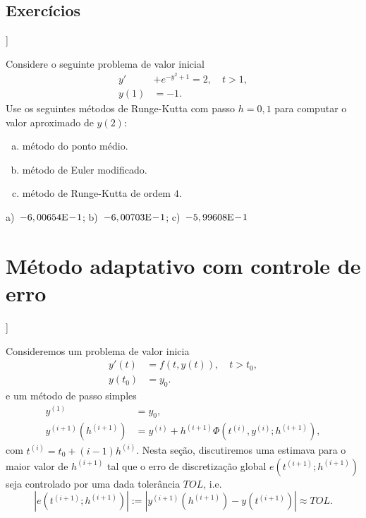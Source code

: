 \subsection{Exercícios}

\begin{flushleft}
  [[tag:revisar]]
\end{flushleft}

\begin{exer}
  Considere o seguinte problema de valor inicial
  \begin{align}
    y' &+ e^{-y^2+1} = 2,\quad t>1,\\
    y(1) &= -1.
  \end{align}
Use os seguintes métodos de Runge-Kutta com passo $h=0,1$ para computar o valor aproximado de $y(2)$:
\begin{enumerate}[a)]
\item método do ponto médio.
\item método de Euler modificado.
\item método de Runge-Kutta de ordem $4$.
\end{enumerate}
\end{exer}
\begin{resp}
  a)~$-6,00654\mathrm{E}\!-\!1$; b)~$-6,00703\mathrm{E}\!-\!1$; c)~$-5,99608\mathrm{E}\!-\!1$
\end{resp}

\section{Método adaptativo com controle de erro}\label{cap_pvi_met_adap}

\begin{flushleft}
  [[tag:revisar]]
\end{flushleft}

Consideremos um problema de valor inicia
\begin{align}
  y'(t) &= f(t,y(t)),\quad t>t_0,\\
  y(t_0) &= y_0.
\end{align}
e um método de passo simples
\begin{align}
  y^{(1)} &= y_0,\\
  y^{(i+1)}(h^{(i+1)}) &= y^{(i)} + h^{(i+1)}\Phi(t^{(i)},y^{(i)};h^{(i+1)}),
\end{align}
com $t^{(i)} = t_0 + (i-1)h^{(i)}$. Nesta seção, discutiremos uma estimava para o maior valor de $h^{(i+1)}$ tal que o erro de discretização global $e(t^{(i+1)};h^{(i+1)})$ seja controlado por uma dada tolerância $TOL$, i.e.
\begin{equation}\label{eq:pvi_erro_aux1}
  |e(t^{(i+1)};h^{(i+1)})| := |y^{(i+1)}(h^{(i+1)}) - y(t^{(i+1)})| \approx TOL.
\end{equation}

